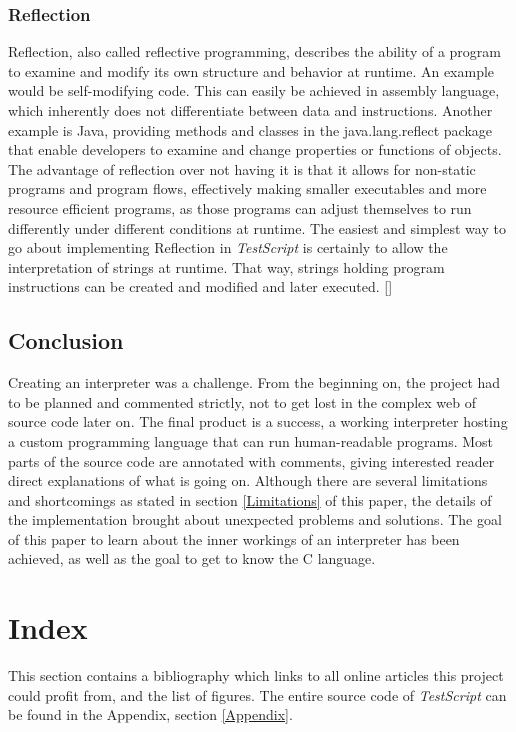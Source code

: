 \documentclass[12pt,a4paper]{article}
\newcommand{\name}{\emph{TestScript}}
\begin{document}
\subsubsection{Reflection}
Reflection, also called reflective programming, describes
the ability of a program to examine and modify its own structure and behavior 
at runtime. An example would be self-modifying code. This can easily be
achieved in assembly language, which inherently does not differentiate between
data and instructions.
Another example is Java, providing methods and classes in the java.lang.reflect
package that enable developers to examine and change properties or functions
of objects.
The advantage of reflection over not having it is that it allows for non-static
programs and program flows, effectively making smaller executables and more
resource efficient programs, as those programs can adjust themselves to run
differently under different conditions at runtime.
The easiest and simplest way to go about implementing Reflection in \name{} is
certainly to allow the interpretation of strings at runtime. That way, strings
holding program instructions can be created and modified and later executed.
[]

\subsection{Conclusion}
Creating an interpreter was a challenge. From the beginning on, the project
had to be planned and commented strictly, not to get lost in the complex web
of source code later on. The final product is a success, a working interpreter
hosting a custom programming language that can run human-readable programs.
Most parts of the source code are annotated with comments, giving interested
reader direct explanations of what is going on.
Although there are several limitations and shortcomings as stated in section \ref{Limitations}
of this paper, the details of the implementation brought about unexpected 
problems and solutions. The goal of this paper to learn about 
the inner workings of an interpreter has been achieved, as well as the goal
to get to know the C language.


\section{Index}
This section contains a bibliography which links to all online articles
this project could profit from, and the list of figures.
The entire source code of \name{} can be found in the Appendix, section \ref{Appendix}.
\end{document}
